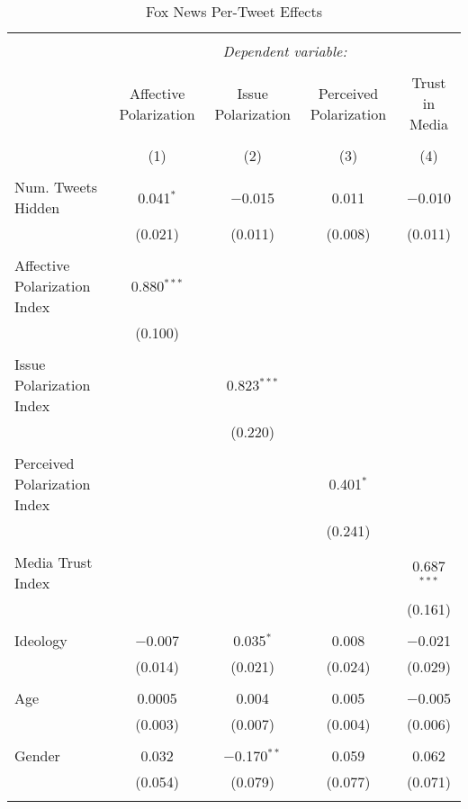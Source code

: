 
\begin{table}[!htbp] \centering 
  \caption{Fox News Per-Tweet Effects} 
  \label{} 
\tiny 
\begin{tabular}{@{\extracolsep{5pt}}lcccc} 
\\[-1.8ex]\hline 
\hline \\[-1.8ex] 
 & \multicolumn{4}{c}{\textit{Dependent variable:}} \\ 
\cline{2-5} 
\\[-1.8ex] & Affective Polarization & Issue Polarization & Perceived Polarization & Trust in Media \\ 
\\[-1.8ex] & (1) & (2) & (3) & (4)\\ 
\hline \\[-1.8ex] 
 Num. Tweets Hidden & 0.041$^{*}$ & $-$0.015 & 0.011 & $-$0.010 \\ 
  & (0.021) & (0.011) & (0.008) & (0.011) \\ 
  & & & & \\ 
 Affective Polarization Index & 0.880$^{***}$ &  &  &  \\ 
  & (0.100) &  &  &  \\ 
  & & & & \\ 
 Issue Polarization Index &  & 0.823$^{***}$ &  &  \\ 
  &  & (0.220) &  &  \\ 
  & & & & \\ 
 Perceived Polarization Index &  &  & 0.401$^{*}$ &  \\ 
  &  &  & (0.241) &  \\ 
  & & & & \\ 
 Media Trust Index &  &  &  & 0.687$^{***}$ \\ 
  &  &  &  & (0.161) \\ 
  & & & & \\ 
 Ideology & $-$0.007 & 0.035$^{*}$ & 0.008 & $-$0.021 \\ 
  & (0.014) & (0.021) & (0.024) & (0.029) \\ 
  & & & & \\ 
 Age & 0.0005 & 0.004 & 0.005 & $-$0.005 \\ 
  & (0.003) & (0.007) & (0.004) & (0.006) \\ 
  & & & & \\ 
 Gender & 0.032 & $-$0.170$^{**}$ & 0.059 & 0.062 \\ 
  & (0.054) & (0.079) & (0.077) & (0.071) \\ 
  & & & & \\ 

\end{tabular}
\end{table}
